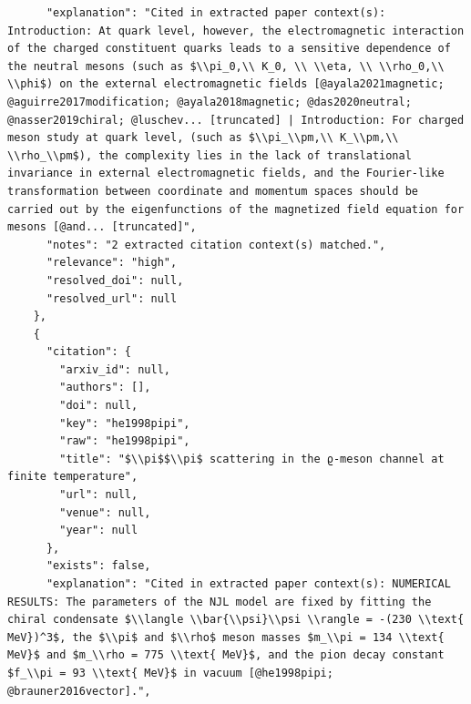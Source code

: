 \documentclass[11pt]{article}
\begin{document}
\begin{verbatim}
      "explanation": "Cited in extracted paper context(s): Introduction: At quark level, however, the electromagnetic interaction of the charged constituent quarks leads to a sensitive dependence of the neutral mesons (such as $\\pi_0,\\ K_0, \\ \\eta, \\ \\rho_0,\\ \\phi$) on the external electromagnetic fields [@ayala2021magnetic; @aguirre2017modification; @ayala2018magnetic; @das2020neutral; @nasser2019chiral; @luschev... [truncated] | Introduction: For charged meson study at quark level, (such as $\\pi_\\pm,\\ K_\\pm,\\ \\rho_\\pm$), the complexity lies in the lack of translational invariance in external electromagnetic fields, and the Fourier-like transformation between coordinate and momentum spaces should be carried out by the eigenfunctions of the magnetized field equation for mesons [@and... [truncated]",
      "notes": "2 extracted citation context(s) matched.",
      "relevance": "high",
      "resolved_doi": null,
      "resolved_url": null
    },
    {
      "citation": {
        "arxiv_id": null,
        "authors": [],
        "doi": null,
        "key": "he1998pipi",
        "raw": "he1998pipi",
        "title": "$\\pi$$\\pi$ scattering in the ϱ-meson channel at finite temperature",
        "url": null,
        "venue": null,
        "year": null
      },
      "exists": false,
      "explanation": "Cited in extracted paper context(s): NUMERICAL RESULTS: The parameters of the NJL model are fixed by fitting the chiral condensate $\\langle \\bar{\\psi}\\psi \\rangle = -(230 \\text{ MeV})^3$, the $\\pi$ and $\\rho$ meson masses $m_\\pi = 134 \\text{ MeV}$ and $m_\\rho = 775 \\text{ MeV}$, and the pion decay constant $f_\\pi = 93 \\text{ MeV}$ in vacuum [@he1998pipi; @brauner2016vector].",

\end{verbatim}
\end{document}
